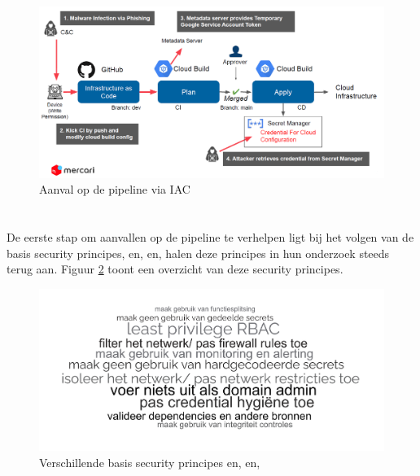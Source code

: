 \begin{figure}[H]
  \centering
  \includegraphics[scale=0.38]{graphics/IACAttack.png}
  \caption{\label{fig:IACAttack}Aanval op de pipeline via IAC \autocite{Suezawa2021}}
\end{figure}

\section{}
\label{sec:Beveiligingsmaatregelen om secrets te beschermen}

\subsection{}%
\label{sec:Secrets in versie beheer en basis security principes}
De eerste stap om aanvallen op de pipeline te verhelpen ligt bij het volgen van de basis security principes, \autocite{Smart2022} en,  \autocite{Haymore2022} en, \autocite{Suezawa2021} halen deze principes in hun onderzoek steeds terug aan. Figuur \ref{fig:wordcloudv2} toont een overzicht van deze security principes. 
\clearpage 

\begin{figure}[H]
  \centering
  \includegraphics[scale=0.14]{graphics/wordcloudv2.png}
  \caption{\label{fig:wordcloudv2}Verschillende basis security principes \autocite{Smart2022} en, \autocite{Haymore2022} en, \autocite{Suezawa2021}}
\end{figure}


